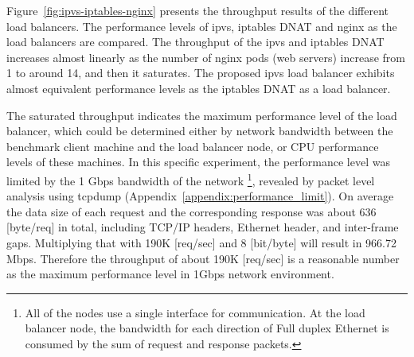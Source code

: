 
Figure~\ref{fig:ipvs-iptables-nginx} presents the throughput results of the different load balancers.
The performance levels of ipvs, iptables DNAT and nginx as the load balancers are compared.
The throughput of the ipvs and iptables DNAT increases almost linearly as the number of nginx pods (web servers) increase from 1 to around 14, and then it saturates.
The proposed ipvs load balancer exhibits almost equivalent performance levels as the iptables DNAT as a load balancer.

The saturated throughput indicates the maximum performance level of the load balancer, which could be determined either by network bandwidth between the benchmark client machine and the load balancer node, or CPU performance levels of these machines.
%
In this specific experiment, the performance level was limited by the 1 Gbps bandwidth of the network
\footnote{
All of the nodes use a single interface for communication. 
At the load balancer node, the bandwidth for each direction of Full duplex Ethernet is consumed by the sum of request and response packets.
},
 revealed by packet level analysis using tcpdump (Appendix~\ref{appendix:performance_limit}).
%
On average the data size of each request and the corresponding response was about 636 [byte/req] in total, including TCP/IP headers, Ethernet header, and inter-frame gaps.
Multiplying that with 190K [req/sec] and 8 [bit/byte] will result in 966.72 Mbps.
Therefore the throughput of about 190K [req/sec] is a reasonable number as the maximum performance level in 1Gbps network environment.


